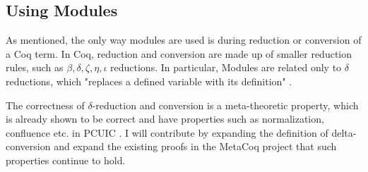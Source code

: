 \subsection{Using Modules}
\label{sec:using-modules}
As mentioned, the only way modules are used is during reduction or conversion
of a Coq term. In Coq, reduction and conversion are made up of smaller reduction
rules, such as $\beta, \delta,\zeta,\eta,\iota$ reductions. In particular, 
Modules are related only to $\delta$ reductions, which "replaces a defined
variable with its definition" 
.

The correctness of $\delta$-reduction and conversion is a meta-theoretic
property, which is already shown to be correct and have properties such as 
normalization, confluence etc. in PCUIC . I will
contribute by expanding the definition of delta-conversion and expand the
existing proofs in the MetaCoq project that such properties continue to hold.
